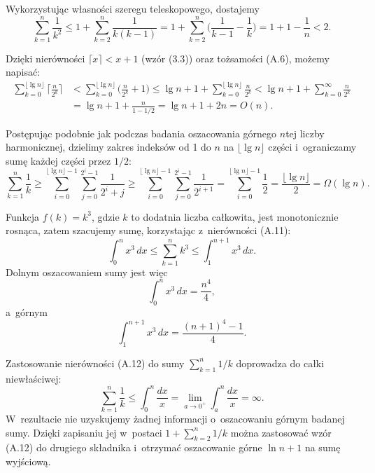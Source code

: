 
\exercise %
Wykorzystując własności szeregu teleskopowego, dostajemy
\[
	\sum_{k=1}^n\frac{1}{k^2} \le 1+\sum_{k=2}^n\frac{1}{k(k-1)} = 1+\sum_{k=2}^n\biggl(\frac{1}{k-1}-\frac{1}{k}\biggr) = 1+1-\frac{1}{n} < 2.
\]

\exercise %
Dzięki nierówności $\lceil x\rceil<x+1$ (wzór (3.3)) oraz tożsamości (A.6), możemy napisać:
\begin{align*}
	\sum_{k=0}^{\lfloor\lg n\rfloor}\biggl\lceil\frac{n}{2^k}\biggr\rceil &< \sum_{k=0}^{\lfloor\lg n\rfloor}\biggl(\frac{n}{2^k}+1\biggr) \le \lg n+1+\sum_{k=0}^{\lfloor\lg n\rfloor}\frac{n}{2^k} < \lg n+1+\sum_{k=0}^\infty\frac{n}{2^k} \\[2mm]
	&= \lg n+1+\frac{n}{1-1/2} = \lg n+1+2n = O(n).
\end{align*}

\exercise %
Postępując podobnie jak podczas badania oszacowania górnego $n$\nbhyphen tej liczby harmonicznej, dzielimy zakres indeksów od 1 do $n$ na $\lfloor\lg n\rfloor$ części i~ograniczamy sumę każdej części przez $1/2$:
\[
    \sum_{k=1}^n\frac{1}{k} \ge \sum_{i=0}^{\lfloor\lg n\rfloor-1}\sum_{j=0}^{2^i-1}\frac{1}{2^i+j} \ge \sum_{i=0}^{\lfloor\lg n\rfloor-1}\sum_{j=0}^{2^i-1}\frac{1}{2^{i+1}} = \sum_{i=0}^{\lfloor\lg n\rfloor-1}\frac{1}{2} = \frac{\lfloor\lg n\rfloor}{2} = \Omega(\lg n).
\]

\exercise %
Funkcja $f(k)=k^3$, gdzie $k$ to dodatnia liczba całkowita, jest monotonicznie rosnąca, zatem szacujemy sumę, korzystając z~nierówności (A.11):
\[
	\int_0^nx^3\,dx \le \sum_{k=1}^nk^3 \le \int_1^{n+1}x^3\,dx.
\]
Dolnym oszacowaniem sumy jest więc
\[
	\int_0^nx^3\,dx = \frac{n^4}{4},
\]
a~górnym
\[
	\int_1^{n+1}x^3\,dx = \frac{(n+1)^4-1}{4}.
\]

\exercise %
Zastosowanie nierówności (A.12) do sumy $\sum_{k=1}^n1/k$ doprowadza do całki niewłaściwej:
\[
	\sum_{k=1}^n\frac{1}{k} \le \int_0^n\frac{dx}{x} = \lim_{a\to0^+}\int_a^n\frac{dx}{x} = \infty.
\]
W~rezultacie nie uzyskujemy żadnej informacji o~oszacowaniu górnym badanej sumy.
Dzięki zapisaniu jej w~postaci $1+\sum_{k=2}^n1/k$ można zastosować wzór (A.12) do drugiego składnika i~otrzymać oszacowanie górne $\ln n+1$ na sumę wyjściową.
